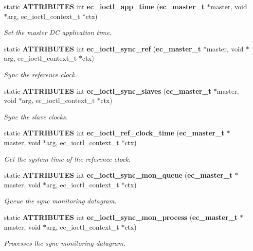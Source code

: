 \begin{DoxyCompactItemize}
static {\bf \-A\-T\-T\-R\-I\-B\-U\-T\-E\-S} int {\bf ec\-\_\-ioctl\-\_\-app\-\_\-time} ({\bf ec\-\_\-master\-\_\-t} $\ast$master, void $\ast$arg, ec\-\_\-ioctl\-\_\-context\-\_\-t $\ast$ctx)
\begin{DoxyCompactList}\small\item\em \-Set the master \-D\-C application time. \end{DoxyCompactList}\item 
static {\bf \-A\-T\-T\-R\-I\-B\-U\-T\-E\-S} int {\bf ec\-\_\-ioctl\-\_\-sync\-\_\-ref} ({\bf ec\-\_\-master\-\_\-t} $\ast$master, void $\ast$arg, ec\-\_\-ioctl\-\_\-context\-\_\-t $\ast$ctx)
\begin{DoxyCompactList}\small\item\em \-Sync the reference clock. \end{DoxyCompactList}\item 
static {\bf \-A\-T\-T\-R\-I\-B\-U\-T\-E\-S} int {\bf ec\-\_\-ioctl\-\_\-sync\-\_\-slaves} ({\bf ec\-\_\-master\-\_\-t} $\ast$master, void $\ast$arg, ec\-\_\-ioctl\-\_\-context\-\_\-t $\ast$ctx)
\begin{DoxyCompactList}\small\item\em \-Sync the slave clocks. \end{DoxyCompactList}\item 
static {\bf \-A\-T\-T\-R\-I\-B\-U\-T\-E\-S} int {\bf ec\-\_\-ioctl\-\_\-ref\-\_\-clock\-\_\-time} ({\bf ec\-\_\-master\-\_\-t} $\ast$master, void $\ast$arg, ec\-\_\-ioctl\-\_\-context\-\_\-t $\ast$ctx)
\begin{DoxyCompactList}\small\item\em \-Get the system time of the reference clock. \end{DoxyCompactList}\item 
static {\bf \-A\-T\-T\-R\-I\-B\-U\-T\-E\-S} int {\bf ec\-\_\-ioctl\-\_\-sync\-\_\-mon\-\_\-queue} ({\bf ec\-\_\-master\-\_\-t} $\ast$master, void $\ast$arg, ec\-\_\-ioctl\-\_\-context\-\_\-t $\ast$ctx)
\begin{DoxyCompactList}\small\item\em \-Queue the sync monitoring datagram. \end{DoxyCompactList}\item 
static {\bf \-A\-T\-T\-R\-I\-B\-U\-T\-E\-S} int {\bf ec\-\_\-ioctl\-\_\-sync\-\_\-mon\-\_\-process} ({\bf ec\-\_\-master\-\_\-t} $\ast$master, void $\ast$arg, ec\-\_\-ioctl\-\_\-context\-\_\-t $\ast$ctx)
\begin{DoxyCompactList}\small\item\em \-Processes the sync monitoring datagram. \end{DoxyCompactList}\item 

\end{DoxyCompactItemize}
